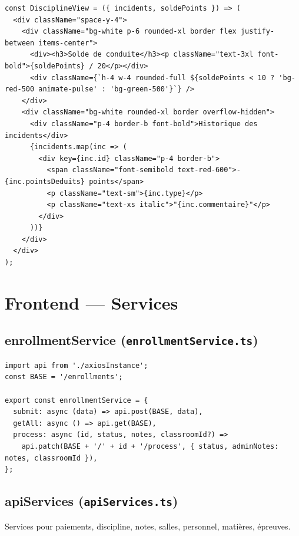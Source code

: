 \documentclass[12pt,a4paper]{article}
\begin{document}
\begin{lstlisting}[style=code]
const DisciplineView = ({ incidents, soldePoints }) => (
  <div className="space-y-4">
    <div className="bg-white p-6 rounded-xl border flex justify-between items-center">
      <div><h3>Solde de conduite</h3><p className="text-3xl font-bold">{soldePoints} / 20</p></div>
      <div className={`h-4 w-4 rounded-full ${soldePoints < 10 ? 'bg-red-500 animate-pulse' : 'bg-green-500'}`} />
    </div>
    <div className="bg-white rounded-xl border overflow-hidden">
      <div className="p-4 border-b font-bold">Historique des incidents</div>
      {incidents.map(inc => (
        <div key={inc.id} className="p-4 border-b">
          <span className="font-semibold text-red-600">-{inc.pointsDeduits} points</span>
          <p className="text-sm">{inc.type}</p>
          <p className="text-xs italic">"{inc.commentaire}"</p>
        </div>
      ))}
    </div>
  </div>
);
\end{lstlisting}

\newpage

\section{Frontend --- Services}

\subsection{enrollmentService (\texttt{enrollmentService.ts})}

\begin{lstlisting}[style=code]
import api from './axiosInstance';
const BASE = '/enrollments';

export const enrollmentService = {
  submit: async (data) => api.post(BASE, data),
  getAll: async () => api.get(BASE),
  process: async (id, status, notes, classroomId?) =>
    api.patch(BASE + '/' + id + '/process', { status, adminNotes: notes, classroomId }),
};
\end{lstlisting}

\subsection{apiServices (\texttt{apiServices.ts})}

Services pour paiements, discipline, notes, salles, personnel, matières, épreuves.
\end{document}
